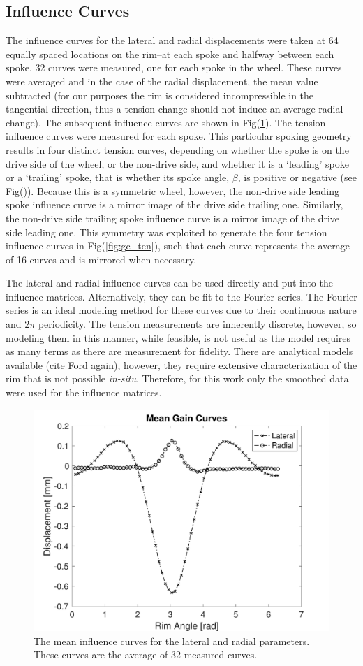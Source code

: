 \documentclass[journal]{IEEEtran}
\begin{document}
\subsection{Influence Curves}
The influence curves for the lateral and radial displacements were taken at 64 equally spaced locations on the rim--at each spoke and halfway between each spoke.  32 curves were measured, one for each spoke in the wheel.  These curves were averaged and in the case of the radial displacement, the mean value subtracted (for our purposes the rim is considered incompressible in the tangential direction, thus a tension change should not induce an average radial change).  The subsequent influence curves are shown in Fig(\ref{fig:gclr}).  The tension influence curves were measured for each spoke.  This particular spoking geometry results in four distinct tension curves, depending on whether the spoke is on the drive side of the wheel, or the non-drive side, and whether it is a `leading' spoke or a `trailing' spoke, that is whether its spoke angle, $\beta$, is positive or negative (see Fig()).  Because this is a symmetric wheel, however, the non-drive side leading spoke influence curve is a mirror image of the drive side trailing one.  Similarly, the non-drive side trailing spoke influence curve is a mirror image of the drive side leading one. This symmetry was exploited to generate the four tension influence curves in Fig(\ref{fig:gc_ten}), such that each curve represents the average of 16 curves and is mirrored when necessary.

The lateral and radial influence curves can be used directly and put into the influence matrices.  Alternatively, they can be fit to the Fourier series. The Fourier series is an ideal modeling method for these curves due to their continuous nature and $2\pi$ periodicity. The tension measurements are inherently discrete, however, so modeling them in this manner, while feasible, is not useful as the model requires as many terms as there are measurement for fidelity. There are analytical models available (cite Ford again), however, they require extensive characterization of the rim that is not possible \emph{in-situ}.  Therefore, for this work only the smoothed data were used for the influence matrices.  

\begin{figure}[!t]
\centering
\includegraphics[width=3.25 in]{./figs/gc_lat_rad}
\caption{The mean influence curves for the lateral and radial parameters.  These curves are the average of 32 measured curves.}
\label{fig:gclr}
\end{figure}
\end{document}
